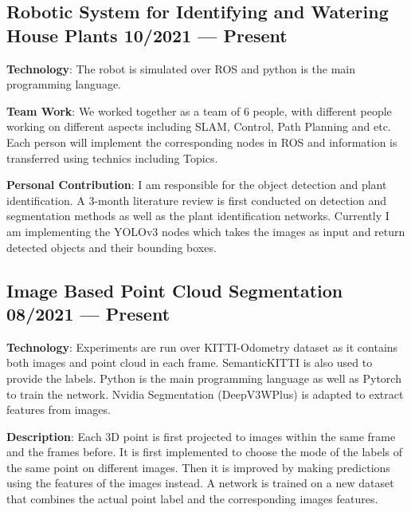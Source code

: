 
\subsection{{Robotic System for Identifying and Watering House Plants 
    \hfill 10/2021 --- Present}}
\begin{zitemize}
    \item \textbf{Technology}: The robot is simulated over ROS and python is the main
        programming language. 
    \item \textbf{Team Work}: We worked together as a team of 6 people, with different
        people working on different aspects including SLAM, Control, 
        Path Planning and etc. Each person will implement the corresponding 
        nodes in ROS and information is transferred using technics including
        Topics.
    \item \textbf{Personal Contribution}: I am responsible for the object 
        detection and plant identification. 
        A 3-month literature review is first conducted on detection and 
        segmentation methods as well as the plant identification networks.
        Currently I am implementing the YOLOv3 nodes which takes the images
        as input and return detected objects and their bounding boxes.
\end{zitemize}

\subsection{{Image Based Point Cloud Segmentation 
    \hfill 08/2021 --- Present}}
\begin{zitemize}
    \item \textbf{Technology}: Experiments are run over KITTI-Odometry dataset 
        as it contains both images and point cloud in each frame.
        SemanticKITTI is also used to provide the labels.
        Python is the main programming language as well as Pytorch to train
        the network.
        Nvidia Segmentation (DeepV3WPlus) is adapted to extract features from 
        images.
    \item \textbf{Description}: Each 3D point is first projected to images within
        the same frame and the frames before. 
        It is first implemented to choose the mode of the labels of the same point
        on different images. 
        Then it is improved by making predictions using the features of the images
        instead.
        A network is trained on a new dataset that combines the actual point
        label and the corresponding images features. 
\end{zitemize}

